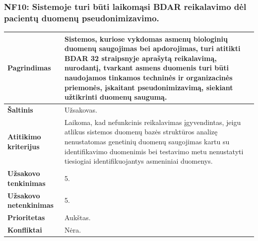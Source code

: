 \documentclass[12pt]{article}
\begin{document}
\subsubsection*{NF10: Sistemoje turi būti laikomąsi BDAR reikalavimo dėl
pacientų duomenų pseudonimizavimo.}
\label{sec:NF10}
\begin{table}[htb!]
    \captionsetup{justification=centering}
    \begin{tabular}{|m{4.9cm}|m{11cm}|}
        \hline
        \raggedleft \textbf{\cellcolor{deepchampagne}Pagrindimas} &
        Sistemos, kuriose vykdomas asmenų biologinių duomenų saugojimas bei
        apdorojimas, turi atitikti BDAR 32 straipsnyje aprašytą reikalavimą,
        nurodantį, tvarkant asmens duomenis turi būti naudojamos tinkamos
        techninės ir organizacinės priemonės, įskaitant pseudonimizavimą,
        siekiant užtikrinti duomenų saugumą. \\
        \hline
        \raggedleft \textbf{\cellcolor{deepchampagne}Šaltinis} & Užsakovas. \\
        \hline
        \raggedleft \textbf{\cellcolor{deepchampagne}Atitikimo kriterijus} & 
        Laikoma, kad nefunkcinis reikalavimas įgyvendintas, jeigu atlikus
        sistemos duomenų bazės struktūros analizę nenustatomas genetinių duomenų
        saugojimas kartu su identifikavimo duomenimis bei testavimo metu
        nenustatyti tiesiogiai identifikuojantys asmeniniai duomenys. \\
        \hline
        \raggedleft \textbf{\cellcolor{deepchampagne}Užsakovo tenkinimas} & 5. \\
        \hline
        \raggedleft \textbf{\cellcolor{deepchampagne}Užsakovo netenkinimas} & 5. \\
        \hline
        \raggedleft \textbf{\cellcolor{deepchampagne}Prioritetas} & Aukštas. \\
        \hline
        \raggedleft \textbf{\cellcolor{deepchampagne}Konfliktai} & Nėra. \\
        \hline
    \end{tabular}
\end{table}

\newpage

\end{document}
